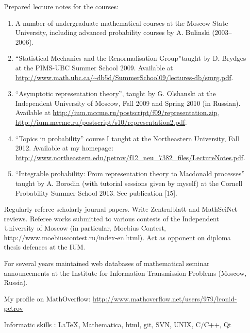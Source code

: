\documentclass[letterpaper,11pt]{article}
\begin{document}
Prepared lecture notes for the courses:
\begin{enumerate}
  \item A number of 
  undergraduate mathematical courses 
  at the Moscow State University, 
  including advanced probability courses
  by A. Bulinski (2003--2006).

  \item ``Statistical Mechanics and the Renormalisation Group''taught by D. Brydges
  at the PIMS-UBC Summer School 2009.
  Available at \\
  \url{http://www.math.ubc.ca/~db5d/SummerSchool09/lectures-db/smrg.pdf}.

  \item ``Asymptotic representation theory'',
  taught by G. Olshanski 
  at the Independent University of Moscow,
  Fall 2009 and Spring 2010 (in Russian). 
  Available at 
  \url{http://ium.mccme.ru/postscript/f09/representation.zip},
  \url{http://ium.mccme.ru/postscript/s10/representation2.pdf}.

  \item ``Topics in probability''
  course I taught
  at the Northeastern University, 
  Fall 2012. Available at
  my homepage:
  \url{http://www.northeastern.edu/petrov/f12_neu_7382_files/LectureNotes.pdf}.

  \item ``Integrable probability: From representation theory to Macdonald processes''
  taught by A. Borodin (with tutorial sessions 
  given by myself)
  at the Cornell Probability Summer School 2013.
  See publication [15].
\end{enumerate}

\smallskip


Regularly referee scholarly journal papers. Write Zentralblatt and MathSciNet reviews. Referee works submitted to various contests of the Independent University of Moscow (in particular, Moebius Contest, \url{http://www.moebiuscontest.ru/index-en.html}). Act as opponent on diploma thesis defences at the IUM.

\smallskip

For several years maintained web databases of mathematical seminar announcements at the Institute for Information Transmission Problems (Moscow, Russia).

\smallskip

My profile on MathOverflow: \url{http://www.mathoverflow.net/users/979/leonid-petrov}

\smallskip

Informatic skills : \LaTeX, Mathematica, html, git, SVN, UNIX, C/C++, Qt
\end{document}
